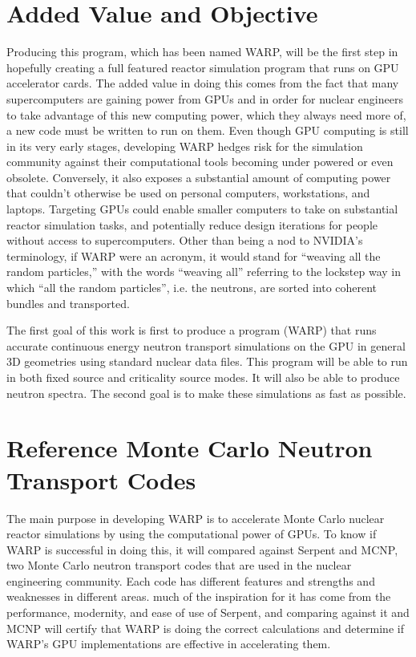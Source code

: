\section{Added Value and Objective}

Producing this program, which has been named WARP, will be the first step in hopefully creating a full featured reactor simulation program that runs on GPU accelerator cards.  The added value in doing this comes from the fact that many supercomputers are gaining power from GPUs and in order for nuclear engineers to take advantage of this new computing power, which they always need more of, a new code must be written to run on them.  Even though GPU computing is still in its very early stages, developing WARP hedges risk for the simulation community against their computational tools becoming under powered or even obsolete.  Conversely, it also exposes a substantial amount of  computing power that couldn't otherwise be used on personal computers, workstations, and laptops.  Targeting GPUs could enable smaller computers to take on substantial reactor simulation tasks, and potentially reduce design iterations for people without access to supercomputers.  Other than being a nod to NVIDIA's terminology, if WARP were an acronym, it would stand for ``weaving all the random particles,'' with the words ``weaving all'' referring to the lockstep way in which ``all the random particles'', i.e. the neutrons, are sorted into coherent bundles and transported.

The first goal of this work is first to produce a program (WARP) that runs accurate continuous energy neutron transport simulations on the GPU in general 3D geometries using standard nuclear data files.  This program will be able to run in both fixed source and criticality source modes.  It will also be able to produce neutron spectra.  The second goal is to make these simulations as fast as possible.

\section{Reference Monte Carlo Neutron Transport Codes}

The main purpose in developing WARP is to accelerate Monte Carlo nuclear reactor simulations by using the computational power of GPUs.  To know if WARP is successful in doing this, it will compared against Serpent and MCNP, two Monte Carlo neutron transport codes that are used in the nuclear engineering community.  Each code has different features and strengths and weaknesses in different areas.  much of the inspiration for it has come from the performance, modernity, and ease of use of Serpent, and comparing against it and MCNP will certify that WARP is doing the correct calculations and determine if WARP's GPU implementations are effective in accelerating them.  

